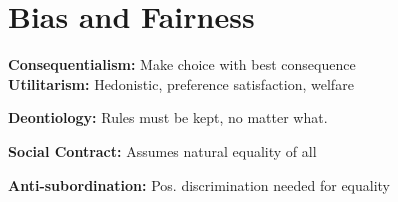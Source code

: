 \begin{comment}
	\pagebreak
\end{comment}

\section{Bias and Fairness}
\begin{comment}
	Labeling is biased, if you predict the same labels, we only reproduce the bias.\\
	The sample selection is also biased, as sometimes the training data only fits a certain profile (crime).\\
	Sometimes the whole task is biased, anyone who does not fall in a certain category is not included from the beginning.\\
	If the test set is imbalanced, the loss function learns to ignore the minorities, to get the majority right.\\
\end{comment}

\textbf{Consequentialism:} Make choice with best consequence\\

\textbf{Utilitarism:} Hedonistic, preference satisfaction, welfare\\
\begin{comment}
	Utilitarism is a specific case of consequentialism.
	Hedonistic: Individual pleasure\\
	Preference satisfaction: Inderect Pleasure\\
	Welfare: Long-term over short term satisfaction\\
\end{comment}

\textbf{Deontiology:} Rules must be kept, no matter what.\\
\begin{comment}
	Break rules even when there are good reasons to do it is wrong.
	Be good is not the same as not being bad.\\
\end{comment}

\textbf{Social Contract:} Assumes natural equality of all\\
\begin{comment}
	Obligations between agents are conventional; conventions secure important human interests.\\
	Mutually advantageous: Nothing wrong with harming people, but better not to if that means others can harm me.\\
	Morality as a right: We all have equal innate rights (rights to fair trial, etc.) which are not negotiated
\end{comment}

\textbf{Anti-subordination:} Pos. discrimination needed for equality\\
\begin{comment}
	You discriminate by actively searching for a women, but only to address that there are not enough women.\\
\end{comment}

